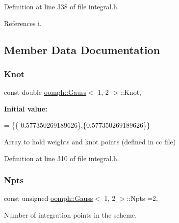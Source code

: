 Definition at line 338 of file integral.\+h.



References i.



\subsection{Member Data Documentation}
\mbox{\label{classoomph_1_1Gauss_3_011_00_012_01_4_a9b1181c72075e2d9adf54b7a9f823f8e}} 
\subsubsection{\texorpdfstring{Knot}{Knot}}
{\footnotesize\ttfamily const double \hyperlink{classoomph_1_1Gauss}{oomph\+::\+Gauss}$<$ 1, 2 $>$\+::Knot\hspace{0.3cm}{\ttfamily [static]}, {\ttfamily [private]}}

{\bfseries Initial value\+:}
\begin{DoxyCode}
=
\{\{-0.577350269189626\},\{0.577350269189626\}\}
\end{DoxyCode}


Array to hold weights and knot points (defined in cc file) 



Definition at line 310 of file integral.\+h.

\mbox{\label{classoomph_1_1Gauss_3_011_00_012_01_4_a48c241a8812e55bb89ebcf0f7803050b}} 
\subsubsection{\texorpdfstring{Npts}{Npts}}
{\footnotesize\ttfamily const unsigned \hyperlink{classoomph_1_1Gauss}{oomph\+::\+Gauss}$<$ 1, 2 $>$\+::Npts =2\hspace{0.3cm}{\ttfamily [static]}, {\ttfamily [private]}}



Number of integration points in the scheme. 



